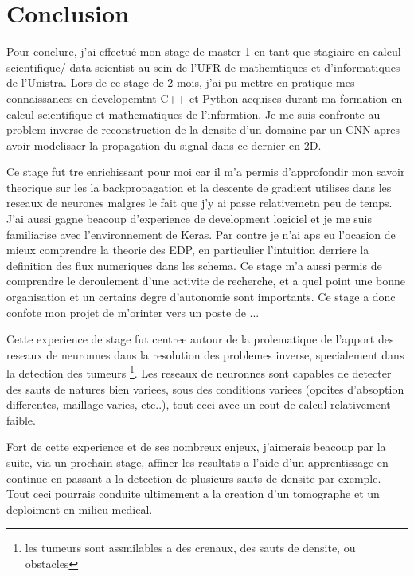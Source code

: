 
\chapter{Conclusion} %

\label{Chapter6} %


Pour conclure, j’ai effectué mon stage de master 1 en tant que stagiaire en calcul scientifique/ data scientist au sein de l'UFR de mathemtiques et d'informatiques de l'Unistra. Lors de ce stage de 2 mois, j’ai pu mettre en pratique mes connaissances en developemtnt C++ et Python acquises durant ma formation en calcul scientifique et mathematiques de l'informtion. Je me suis confronte au problem inverse de reconstruction de la densite d'un domaine par un CNN apres avoir modelisaer la propagation du signal dans ce dernier en 2D.

Ce stage fut tre enrichissant pour moi car il m'a permis d'approfondir mon savoir theorique sur les la backpropagation et la descente de gradient utilises dans les reseaux de neurones malgres le fait que j'y ai passe relativemetn peu de temps. J'ai aussi gagne beacoup d'experience de development logiciel et je me suis familiarise avec l'environnement de Keras. Par contre je n'ai aps eu l'ocasion de mieux comprendre la theorie des EDP, en particulier l'intuition derriere la definition des flux numeriques dans les schema. Ce stage m’a aussi permis de comprendre le deroulement d'une activite de recherche, et a quel point une bonne organisation et un certains degre d'autonomie sont importants. Ce stage a donc confote mon projet de m'orinter vers un poste de ...

Cette experience de stage fut centree autour de la prolematique de l'apport des reseaux de neuronnes dans la resolution des problemes inverse, specialement dans la detection des tumeurs \footnote{les tumeurs sont assmilables a des crenaux, des sauts de densite, ou obstacles}. Les reseaux de neuronnes sont capables de detecter des sauts de natures bien variees, sous des conditions variees (opcites d'absoption differentes, maillage varies, etc..), tout ceci avec un cout de calcul relativement faible.

Fort de cette experience et de ses nombreux enjeux, j'aimerais beacoup par la suite, via un prochain stage,  affiner les resultats a l'aide d'un apprentissage en continue en passant a la detection de plusieurs sauts de densite par exemple. Tout ceci pourrais conduite ultimement a la creation d'un tomographe et un deploiment en milieu medical.
